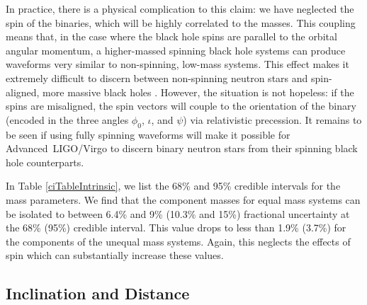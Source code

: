 \documentclass[11pt,a4paper]{emulateapj} 
\begin{document}
In practice, there is a physical complication to this claim: we have
neglected the spin of the binaries, which will be highly correlated to
the masses.  This coupling means that, in the case where the black hole spins
are parallel to the orbital angular momentum, a higher-massed spinning black
hole systems can produce waveforms very similar to non-spinning,
low-mass systems.  This effect makes it extremely difficult to discern between
non-spinning neutron stars and spin-aligned, more massive black holes
\citep{Baird2013,Hannam2013}.  However, the situation is not hopeless:
if the spins are misaligned, the spin vectors will couple to the
orientation of the binary (encoded in the three angles $\phi_0$,
$\iota$, and $\psi$) via relativistic precession.  It remains to be
seen if using fully spinning waveforms will make it possible for
Advanced\ LIGO/Virgo to discern binary neutron stars from their
spinning black hole counterparts.

In Table \ref{ciTableIntrinsic}, we list the 68\% and 95\% credible
intervals for the mass parameters.  We find that the component masses
for equal mass systems can be isolated to between 6.4\% and 9\% (10.3\% and 15\%)
fractional uncertainty at the 68\% (95\%) credible interval.  This value
drops to less than 1.9\% (3.7\%) for the components of the unequal mass systems.
Again, this neglects the effects of spin which can substantially
increase these values.


\subsection{Inclination and Distance}
\label{idSection}
\end{document}
